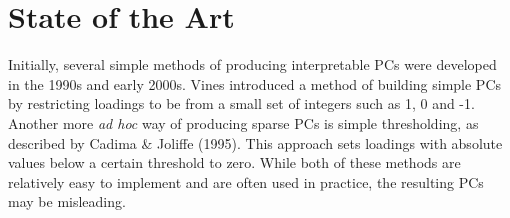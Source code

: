 \documentclass[10pt,letterpaper]{article}
\begin{document}
\section*{State of the Art}

Initially, several simple methods of producing interpretable PCs were developed in the 1990s and early 2000s.  Vines introduced a method of building simple PCs by restricting loadings to be from a small set of integers such as 1, 0 and -1. Another more \textit{ad hoc} way of producing sparse PCs is simple thresholding, as described by Cadima & Joliffe (1995). This approach sets loadings with absolute values below a certain threshold to zero. While both of these methods are relatively easy to implement and are often used in practice, the resulting PCs may be misleading.\\
\\
\end{document}
